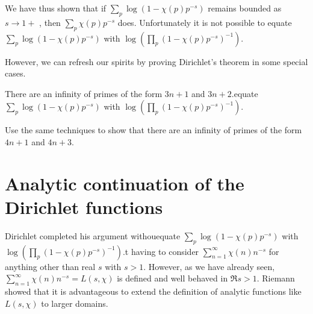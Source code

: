 We have thus shown that if $\sum_{p}\log(1-\chi(p)p^{-s})$
remains bounded as $s\rightarrow 1+$ , then $\sum_{p}\chi(p)p^{-s}$
does. Unfortunately it is not possible to equate
$\sum_{p}\log(1-\chi(p)p^{-s})$
with $\log(\prod_{p}(1-\chi(p)p^{-s})^{-1})$.

However, we can refresh our spirits by proving Dirichlet's
theorem in some special cases.
\begin{example} There are an infinity of primes
of the form $3n+1$ and $3n+2$.equate
$\sum_{p}\log(1-\chi(p)p^{-s})$
with $\log(\prod_{p}(1-\chi(p)p^{-s})^{-1})$.
\end{example}
\begin{exercise} Use the same techniques to show that
there are an infinity of primes
of the form $4n+1$ and $4n+3$.
\end{exercise}
\section{Analytic continuation of the Dirichlet functions}
Dirichlet completed his argument withouequate
$\sum_{p}\log(1-\chi(p)p^{-s})$
with $\log(\prod_{p}(1-\chi(p)p^{-s})^{-1})$.t having to consider
$\sum_{n=1}^{\infty}\chi(n)n^{-s}$ for anything other
than real $s$ with $s>1$. However, as we have already seen,
$\sum_{n=1}^{\infty}\chi(n)n^{-s}=L(s,\chi)$ is defined and well
behaved in $\Re s>1$. Riemann showed that it is advantageous
to extend the definition of analytic
functions like $L(s,\chi)$
to larger domains.

